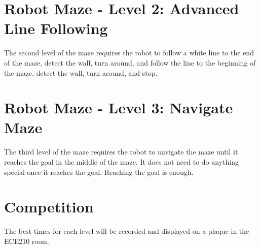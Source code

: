 \documentclass{handout}
\begin{document}
	\section{Robot Maze - Level 2: Advanced Line Following}
	The second level of the maze requires the robot to follow a white line to the end of the maze, detect the wall, turn around, and follow the line to the beginning of the maze, detect the wall, turn around, and stop.
	
	\section{Robot Maze - Level 3: Navigate Maze}
	The third level of the maze requires the robot to navigate the maze until it reaches the goal in the middle of the maze. It does not need to do anything special once it reaches the goal. Reaching the goal is enough.
	
	\section{Competition}
	The best times for each level will be recorded and displayed on a plaque in the ECE210 room.
\end{document}
